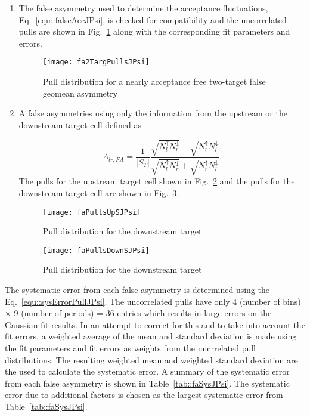 \begin{enumerate}
  \label{tab::additionalFAJPsi}

\item The false asymmetry used to determine the acceptance fluctuations,
  Eq.~\ref{equ::falseAccJPsi}, is checked for compatibility and the
  uncorrelated pulls are shown in Fig.~\ref{fig::fa2TargPullsJPsi} along with
  the corresponding fit parameters and errors.

  \begin{figure}[h!t]
    \centering \texttt{[image: fa2TargPullsJPsi]}
    \caption{Pull distribution for a nearly acceptance free two-target false
      geomean asymmetry}
    \label{fig::fa2TargPullsJPsi}
  \end{figure}

  \item A false asymmetries using only the information from the upstream or the
  downstream target cell defined as

  \begin{equation}
    \label{equ::falseANgeomeanJPsi}
    A_{lr, FA} =
    \frac{1}{|S_T|}
    \frac{\sqrt{N_l^\uparrow N_r^\downarrow}
      - \sqrt{N_r^\uparrow N_l^\downarrow}
    }{
      \sqrt{N_l^\uparrow N_r^\downarrow}
      + \sqrt{N_r^\uparrow N_l^\downarrow}
    }.
  \end{equation}
  The pulls for the upstream target cell shown in Fig.~\ref{fig::faPullsUpSJPsi}
  and the pulls for the downstream target cell are shown in
  Fig.~\ref{fig::faPullsDownSJPsi}.

  \begin{figure}[h!t]
  \centering \texttt{[image: faPullsUpSJPsi]}
  \caption{Pull distribution for the downstream target}
  \label{fig::faPullsUpSJPsi}
  \end{figure}

\begin{figure}[h!t]
  \centering \texttt{[image: faPullsDownSJPsi]}
  \caption{Pull distribution for the downstream target}
  \label{fig::faPullsDownSJPsi}
\end{figure}

\end{enumerate}

The systematic error from each false asymmetry is determined using the
Eq.~\ref{equ::sysErrorPullJPsi}.  The uncorrelated pulls have only 4 (number of
bins) $\times$ 9 (number of periods) = 36 entries which results in large errors
on the Gaussian fit results.  In an attempt to correct for this and to take into
account the fit errors, a weighted average of the mean and standard deviation is
made using the fit parameters and fit errors as weights from the uncrrelated
pull distributions.  The resulting weighted mean and weighted standard deviation
are the used to calculate the systematic error.  A summary of the systematic
error from each false asymmetry is shown in Table~\ref{tab::faSysJPsi}.  The
systematic error due to additional factors is chosen as the largest systematic
error from Table~\ref{tab::faSysJPsi}.

